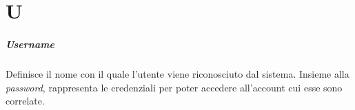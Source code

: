 \chapter{U}

\paragraph*{Username}
Definisce il nome con il quale l'utente viene riconosciuto dal sistema. Insieme alla \textit{password}, rappresenta le credenziali per poter accedere all'account cui esse sono correlate.